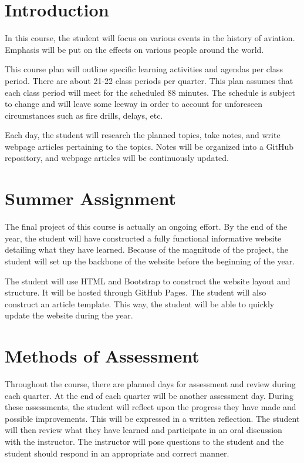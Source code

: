 \documentclass[12pt]{article}
\begin{document}
\section*{Introduction}

In this course, the student will focus on various events in the history of aviation. Emphasis
will be put on the effects on various people around the world.

This course plan will outline specific learning activities and agendas per class period.
There are about 21-22 class periods per quarter. This plan assumes that each class period
will meet for the scheduled 88 minutes. The schedule is subject to change and will leave
some leeway in order to account for unforeseen circumstances such as fire drills, delays, etc.

Each day, the student will research the planned topics, take notes, and write webpage
articles pertaining to the topics. Notes will be organized into a GitHub repository, and
webpage articles will be continuously updated.

\section*{Summer Assignment}

The final project of this course is actually an ongoing effort. By the end of the year, the
student will have constructed a fully functional informative website detailing what they have
learned. Because of the magnitude of the project, the student will set up the backbone of
the website before the beginning of the year.

The student will use HTML and Bootstrap to construct the website layout and structure.
It will be hosted through GitHub Pages. The student will also construct an article template.
This way, the student will be able to quickly update the website during the year.

\section*{Methods of Assessment}

Throughout the course, there are planned days for assessment and review during each
quarter. At the end of each quarter will be another assessment day. During these assessments,
the student will reflect upon the progress they have made and possible improvements. This
will be expressed in a written reflection. The student will then review what they have learned
and participate in an oral discussion with the instructor. The instructor will pose questions
to the student and the student should respond in an appropriate and correct manner.
\end{document}
